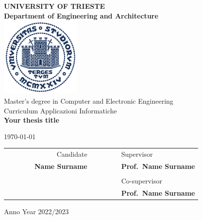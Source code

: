\begin{titlepage}
    \begin{center}
        {\LARGE {\bfseries UNIVERSITY OF TRIESTE \\}}
        \vspace{.5cm}
        {\Large {\bfseries Department of Engineering and Architecture \\}}
        \vspace{1cm}
        \includegraphics[width=4cm,height=4cm]{img/units_sigillo_pantone-534}\\[1.5cm]

        {\LARGE
            Master's degree in Computer and Electronic Engineering \\
        }
        {\LARGE
                Curriculum Applicazioni Informatiche \\
        }
        \vspace{1cm}
        {\LARGE
            {\bfseries Your thesis title}
        }
        \vspace{1cm}

        {\large \today \\
        }

        \vfill
        \begin{table}[h]\label{tab:table}
            {\large
                    \begin{tabular}{c c c c r c c | c c l}
                        & & & & Candidate & & & & & Supervisor \\
                        & & & & \bfseries Name Surname & & & & & \bfseries Prof.\ Name Surname \\
                        & & & & & & & & & \\
                        & & & & & & & & & Co-supervisor \\
                        & & & & & & & & & \bfseries Prof.\ Name Surname \\
                    \end{tabular}
                }
        \end{table}
        Anno Year 2022/2023
    \end{center}
\end{titlepage}
